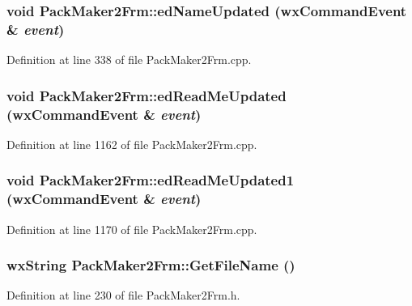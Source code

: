 \subsubsection{\setlength{\rightskip}{0pt plus 5cm}void Pack\-Maker2Frm::ed\-Name\-Updated (wx\-Command\-Event \& {\em event})}\label{class_pack_maker2_frm_684ed24193e2c81011a9b03fa6288bd9}




Definition at line 338 of file Pack\-Maker2Frm.cpp.
\subsubsection{\setlength{\rightskip}{0pt plus 5cm}void Pack\-Maker2Frm::ed\-Read\-Me\-Updated (wx\-Command\-Event \& {\em event})}\label{class_pack_maker2_frm_a40f55406e17140b5eb5b29568dbf499}




Definition at line 1162 of file Pack\-Maker2Frm.cpp.
\subsubsection{\setlength{\rightskip}{0pt plus 5cm}void Pack\-Maker2Frm::ed\-Read\-Me\-Updated1 (wx\-Command\-Event \& {\em event})}\label{class_pack_maker2_frm_da45bcd05a0e43d550e313fa8902d552}




Definition at line 1170 of file Pack\-Maker2Frm.cpp.
\subsubsection{\setlength{\rightskip}{0pt plus 5cm}wx\-String Pack\-Maker2Frm::Get\-File\-Name ()\hspace{0.3cm}{\tt  [inline]}}\label{class_pack_maker2_frm_8d1da75e918fd843a22efc15d36d2aba}




Definition at line 230 of file Pack\-Maker2Frm.h.

